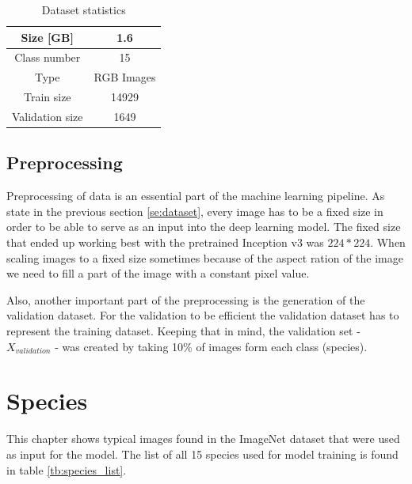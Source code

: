 \documentclass[times, utf8, diplomski]{fer}
\begin{document}
\begin{table}
\centering
\caption{Dataset statistics}
\label{tb:dataset_statistics}
\begin{tabular}{cc}
\hline 
Size [GB] & 1.6 \\ \hline 
Class number & 15 \\ 
Type & RGB Images \\ 
Train size & 14929 \\
Validation size & 1649 \\
\hline 
\end{tabular} 
\end{table}

\subsection{Preprocessing}
Preprocessing of data is an essential part of the machine learning pipeline. As state in the previous section \ref{se:dataset}, every image has to be a fixed size in order to be able to serve as an input into the deep learning model. The fixed size that ended up working best with the pretrained Inception v3 was $224 * 224$. When scaling images to a fixed size sometimes because of the aspect ration of the image we need to fill a part of the image with a constant pixel value.


Also, another important part of the preprocessing is the generation of the validation dataset. For the validation to be efficient the validation dataset has to represent the training dataset. Keeping that in mind, the validation set - $X_{validation}$ - was created by taking 10\% of images form each class (species).


\section{Species}
\label{se:species}

This chapter shows typical images found in the ImageNet dataset that were used as input for the model. The list of all 15 species used for model training is found in table \ref{tb:species_list}.
\end{document}
